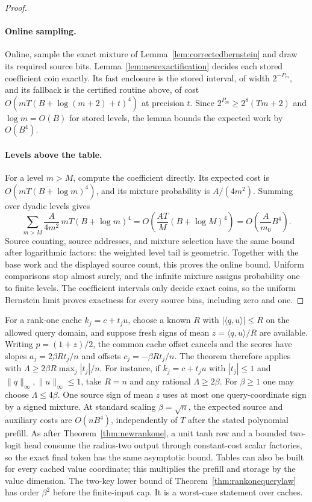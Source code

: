 \begin{proof}
\paragraph{Online sampling.}
Online, sample the exact mixture of Lemma~\ref{lem:correctedbernstein}
and draw its required source bits.  Lemma~\ref{lem:newexactification}
decides each stored coefficient coin exactly.  Its fast enclosure is
the stored interval, of width $2^{-P_m}$, and its fallback is the
certified routine above, of cost $O(mT(B+\log(m+2)+t)^4)$ at
precision $t$.  Since $2^{P_m}\ge2^8(Tm+2)$ and $\log m=O(B)$ for
stored levels, the lemma bounds the expected work by $O(B^4)$.

\paragraph{Levels above the table.}
For a level $m>M$, compute the coefficient directly.  Its expected
cost is $O(mT(B+\log m)^4)$, and its mixture
probability is $A/(4m^2)$.  Summing over dyadic levels gives
\[
 \sum_{m>M}\frac{A}{4m^2}\,
    mT(B+\log m)^4
 =O\left(\frac{AT}{M}(B+\log M)^4\right)
 =O\left(\frac{A}{m_0}B^4\right).
\]
Source counting, source addresses, and mixture selection have the
same bound after logarithmic factors: the weighted level tail is
geometric.  Together with the base work and the displayed source
count, this proves the online bound.  Uniform comparisons stop
almost surely, and the infinite mixture assigns probability one
to finite levels.  The coefficient intervals only decide exact
coins, so the uniform Bernstein limit proves exactness for every
source bias, including zero and one.
\end{proof}

For a rank-one cache $k_j=c+t_j u$, choose a known $R$ with
$|\langle q,u\rangle|\le R$ on the allowed query domain, and
suppose fresh signs of mean $z=\langle q,u\rangle/R$ are available.
Writing $p=(1+z)/2$, the common cache offset cancels and the scores
have slopes $a_j=2\beta R t_j/n$ and offsets $c_j=-\beta R t_j/n$.
The theorem therefore applies with
$\Lambda\ge2\beta R\max_j|t_j|/n$.
For instance, if $k_j=c+t_j u$ with $|t_j|\le1$ and
$\|q\|_\infty,\|u\|_\infty\le1$, take $R=n$ and
any rational $\Lambda\ge2\beta$.  For $\beta\ge1$ one may choose
$\Lambda\le4\beta$.  One source sign of mean $z$ uses at most one
query-coordinate sign by a signed mixture.  At standard scaling
$\beta=\sqrt n$, the expected source and auxiliary costs are
$O(nB^4)$, independently of $T$ after the stated
polynomial prefill.  As after Theorem~\ref{thm:newrankone}, a unit
tanh row and a bounded two-logit head consume the radius-two output
through constant-cost scalar factories, so the exact final token has
the same asymptotic bound.  Tables can also be built for every cached
value coordinate; this multiplies the prefill and storage by the value
dimension.  The two-key lower bound of
Theorem~\ref{thm:rankonequerylaw} has order $\beta^2$ before the
finite-input cap.  It is a worst-case statement over caches.
